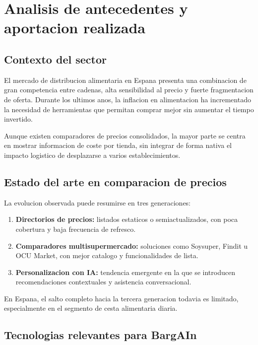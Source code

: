 \chapter{Analisis de antecedentes y aportacion realizada}\label{analanteced}

\section{Contexto del sector}

El mercado de distribucion alimentaria en Espana presenta una combinacion de gran
competencia entre cadenas, alta sensibilidad al precio y fuerte fragmentacion de oferta.
Durante los ultimos anos, la inflacion en alimentacion ha incrementado la necesidad de
herramientas que permitan comprar mejor sin aumentar el tiempo invertido.

Aunque existen comparadores de precios consolidados, la mayor parte se centra en mostrar
informacion de coste por tienda, sin integrar de forma nativa el impacto logistico de
desplazarse a varios establecimientos.

\section{Estado del arte en comparacion de precios}

La evolucion observada puede resumirse en tres generaciones:

\begin{enumerate}
	\item \textbf{Directorios de precios:} listados estaticos o semiactualizados, con
		poca cobertura y baja frecuencia de refresco.
	\item \textbf{Comparadores multisupermercado:} soluciones como Soysuper, Findit u OCU
		Market, con mejor catalogo y funcionalidades de lista.
	\item \textbf{Personalizacion con IA:} tendencia emergente en la que se introducen
		recomendaciones contextuales y asistencia conversacional.
\end{enumerate}

En Espana, el salto completo hacia la tercera generacion todavia es limitado,
especialmente en el segmento de cesta alimentaria diaria.

\section{Tecnologias relevantes para BargAIn}


